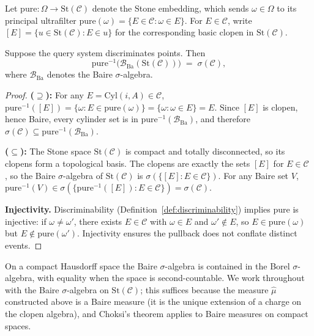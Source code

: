 Let $\mathrm{pure} : \Omega \to \mathrm{St}(\mathcal{C})$ denote the Stone embedding, which sends $\omega \in \Omega$ to its principal ultrafilter $\mathrm{pure}(\omega) = \{E \in \mathcal{C} : \omega \in E\}$. For $E \in \mathcal{C}$, write $[E] = \{u \in \mathrm{St}(\mathcal{C}) : E \in u\}$ for the corresponding basic clopen in $\mathrm{St}(\mathcal{C})$.

\begin{proposition}
\label{prop:B1}
Suppose the query system discriminates points.  Then
\[
  \mathrm{pure}^{-1}\!\bigl(\mathcal{B}_{\mathrm{Ba}}(\mathrm{St}(\mathcal{C}))\bigr)
  \;=\; \sigma(\mathcal{C}),
\]
where $\mathcal{B}_{\mathrm{Ba}}$ denotes the Baire $\sigma$-algebra.
\end{proposition}

\begin{proof}
\textbf{($\supseteq$):}
For any $E = \mathrm{Cyl}(i, A) \in \mathcal{C}$, $\mathrm{pure}^{-1}([E]) = \{\omega : E \in \mathrm{pure}(\omega)\} = \{\omega : \omega \in E\} = E$. Since $[E]$ is clopen, hence Baire, every cylinder set is in $\mathrm{pure}^{-1}(\mathcal{B}_{\mathrm{Ba}})$, and therefore $\sigma(\mathcal{C}) \subseteq \mathrm{pure}^{-1}(\mathcal{B}_{\mathrm{Ba}})$.

\textbf{($\subseteq$):}
The Stone space $\mathrm{St}(\mathcal{C})$ is compact and totally disconnected, so its clopens form a topological basis.  The clopens are exactly the sets $[E]$ for $E \in \mathcal{C}$ \cite[I.3.2]{johnstone1982}, so the Baire $\sigma$-algebra of $\mathrm{St}(\mathcal{C})$ is $\sigma(\{[E] : E \in \mathcal{C}\})$. For any Baire set $V$, $\mathrm{pure}^{-1}(V) \in
\sigma(\{\mathrm{pure}^{-1}([E]) : E \in \mathcal{C}\}) = \sigma(\mathcal{C})$.

\textbf{Injectivity.}
Discriminability (Definition~\ref{def:discriminability}) implies $\mathrm{pure}$ is injective: if $\omega \neq \omega'$, there exists $E \in \mathcal{C}$ with $\omega \in E$ and $\omega' \notin E$, so $E \in \mathrm{pure}(\omega)$ but $E \notin \mathrm{pure}(\omega')$. Injectivity ensures the pullback does not conflate distinct events.
\end{proof}

\begin{remark}
On a compact Hausdorff space the Baire $\sigma$-algebra is contained in the Borel $\sigma$-algebra, with equality when the space is second-countable. We work throughout with the Baire $\sigma$-algebra on $\mathrm{St}(\mathcal{C})$; this suffices because the measure $\hat{\mu}$ constructed above is a Baire measure (it is the unique extension of a charge on the clopen algebra), and Choksi's theorem applies to Baire measures on compact spaces.
\end{remark}

